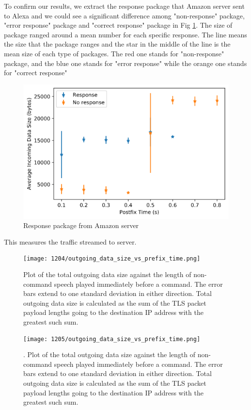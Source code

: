 To confirm our results, we extract the response package that Amazon server sent to Alexa and we could see a significant difference among "non-response" package, "error response" package and "correct response" package in Fig \ref{fig:response_package}. The size of package ranged around a mean number for each specific response. The line means the size that the package ranges and the star in the middle of the line is the mean size of each type of packages. The red one stands for "non-response" package, and the blue one stands for "error response" while the orange one stands for "correct response" 

\begin{figure}[ht]
	\centering
\includegraphics[scale=0.4]{extra_filtered_incoming_data_size}
	\caption{Response package from Amazon server}
	\label{fig:response_package}
	\vspace{-3mm}
	\end{figure}

This measures the traffic streamed to server.


\begin{figure}[]
    \centering
    \texttt{[image: 1204/outgoing\_data\_size\_vs\_prefix\_time.png]}
    \caption{Plot of the total outgoing data size against the length of non-command speech played immediately before a command. The error bars extend to one standard deviation in either direction. Total outgoing data size is calculated as the sum of the TLS packet payload lengths going to the destination IP address with the greatest such sum.}
    \label{fig:prefix_many}
\end{figure}

\begin{figure}[]
    \centering
    \texttt{[image: 1205/outgoing\_data\_size\_vs\_prefix\_time.png]}
    \caption{. Plot of the total outgoing data size against the length of non-command speech played immediately before a command. The error bars extend to one standard deviation in either direction. Total outgoing data size is calculated as the sum of the TLS packet payload lengths going to the destination IP address with the greatest such sum.}
    \label{fig:prefix_two}
\end{figure}

